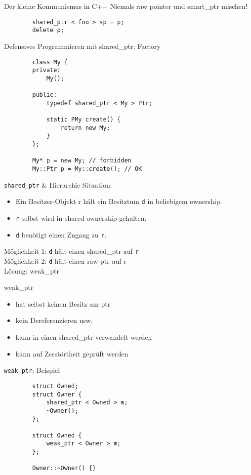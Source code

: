 \begin{frame}[fragile]{Der kleine Kommunismus in C++}
	Niemals raw pointer und smart\_ptr mischen!
	
	\begin{lstlisting}
		shared_ptr < foo > sp = p;
		delete p;
	\end{lstlisting}
	
	\pause
	
	Defensives Programmieren mit shared\_ptr: Factory
	
	\begin{lstlisting}
		class My {
		private:
		    My();
			
		public:
		    typedef shared_ptr < My > Ptr;
			
		    static PMy create() {
		        return new My;
		    }
		};
		
		My* p = new My; // forbidden
		My::Ptr p = My::create(); // OK
	\end{lstlisting}
\end{frame}

\begin{frame}{ \texttt{shared\_ptr} \& Hierarchie }
	Situation:
	\begin{itemize}
		\item Ein Besitzer-Objekt \texttt{}r hält ein Besitztum \texttt{d} in beliebigem ownership.
		\item \texttt{r} selbst wird in shared ownership gehalten.
		\item \texttt{d} benötigt einen Zugang zu \texttt{r}.
	\end{itemize}
	
	\pause
	Möglichkeit 1: \texttt{d} hält einen shared\_ptr auf \texttt{r}\\
	\pause
	Möglichkeit 2: \texttt{d} hält einen raw ptr auf \texttt{}r\\
	\pause
	Lösung: weak\_ptr
	
	\begin{block}{weak\_ptr}
		\begin{itemize}
			\item hat selbst keinen Besitz am ptr
			\item kein Dereferenzieren usw.
			\item kann in einen shared\_ptr verwandelt werden
			\item kann auf Zerstörtheit geprüft werden
		\end{itemize}
	\end{block}
\end{frame}

\begin{frame}[fragile]{ \texttt{weak\_ptr}: Beispiel }
	\begin{lstlisting}
		struct Owned;
		struct Owner {
		    shared_ptr < Owned > m;
		    ~Owner();
		};
		
		struct Owned {
		    weak_ptr < Owner > m;
		};
		
		Owner::~Owner() {}
	\end{lstlisting}
\end{frame}
